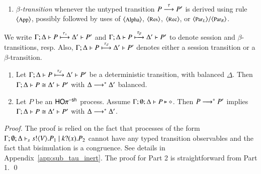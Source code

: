 {\begin{definition}
\begin{enumerate}[$-$]
		\item	{\em $\beta$-transition}
				whenever the untyped transition $P \stackrel{\tau}{\longrightarrow} P'$
				is derived using rule ${\footnotesize \langle \textrm{App} \rangle}$,
				possibly followed by uses of  ${\footnotesize \langle \textrm{Alpha} \rangle}$, ${\footnotesize \langle \textrm{Res} \rangle}$, ${\footnotesize \langle \textrm{Rec} \rangle}$, or ${\footnotesize \langle \textrm{Par${}_L$} \rangle}/
				{\footnotesize \langle \textrm{Par${}_R$} \rangle}$.
	\end{enumerate}
%
	We write
	$\Gamma; \Delta \vdash P \stackrel{\tau_{s}}{\longmapsto} \Delta' \vdash P'$
	and 
	$\Gamma; \Delta \vdash P \stackrel{\tau_{\beta}}{\longmapsto} \Delta' \vdash P'$
	to denote session and $\beta$-transitions, resp. Also, 
	 $\Gamma; \Delta \vdash P \stackrel{\tau_{d}}{\longmapsto} \Delta' \vdash P'$ denotes
	either a session transition or a $\beta$-transition.
\end{definition}
%

\begin{lemma}\rm
	\label{lem:tau_inert}
	\begin{enumerate}[1)]
		\item
				Let $\Gamma; \Delta \vdash P \stackrel{\tau_{d}}{\longmapsto} \Delta' \vdash P'$ be a deterministic transition,
				with balanced $\Delta$. Then 
				$\Gamma; \Delta \vdash P \cong \Delta'\vdash P'$ 
				with $\Delta \longrightarrow^\ast \Delta'$ balanced.

		\item 
				Let $P$ be an $\mathsf{HO}\pi^{-\mathsf{sh}}$ process. 
				Assume $\Gamma; \emptyset; \Delta \vdash P \triangleright \diamond$. Then 
				$P \longrightarrow^\ast P'$ implies $\Gamma; \Delta \vdash 
				P \cong \Delta'\vdash P'$ with $\Delta \longrightarrow^\ast \Delta'$. 
	\end{enumerate}
\end{lemma}


\begin{proof}
	The proof is relied on the fact that processes of the
	form $\Gamma; \emptyset; \Delta \vdash_s s ! \langle V \rangle . P_1 \;|\; k ? (x) . P_2$
	cannot have any typed transition observables and the fact
	that bisimulation is a congruence.
	See details in Appendix~\ref{app:sub_tau_inert}.
	The proof for Part 2 is straightforward from Part 1.
	\qed
\end{proof}
}

